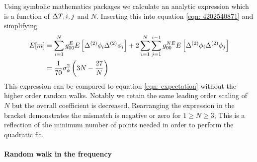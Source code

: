 Using symbolic mathematics packages we 
calculate an analytic expression which is a function of $\Delta T, i, j$ and $N$.
Inserting this into equation \eqref{eqn: 4202540871} and simplifying
\begin{align} 
E[m]  & = \sum_{i=1}^{N}g_{00}^{E} E\left[\Delta^{(2)}\phi_{i}\Delta^{(2)}\phi_{i}\right] 
+ 2 \sum_{i=1}^{N}\sum_{j=1}^{i-1}g_{00}^{NE}E\left[\Delta^{(2)}\phi_{i}\Delta^{(2)}\phi_{j}\right]  \\
& = \frac{1}{70}\sigma_{\phi}^{2}\left(3N - \frac{27}{N}\right)
\label{eqn: Expected mismatch RW in phase k2}
\end{align}
This expression can be compared to equation \eqref{eqn: expectation} without
the higher order random walks. Notably we retain the same leading order scaling
of $N$ but the overall coefficient is decreased. Rearranging the expression in
the bracket demonstrates the mismatch is negative or zero for $1 \ge N \ge 3$;
This is a reflection of the minimum number of points needed in order to perform
the quadratic fit.

\paragraph{Random walk in the frequency}


